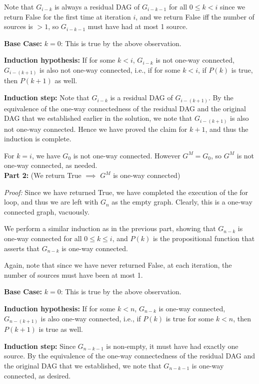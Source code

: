 \documentclass[answers]{exam}
\begin{document}
\begin{questions}
\begin{solution}
Note that $G_{i - k}$ is always a residual DAG of $G_{i - k - 1}$ for all $0 \le k < i$ since we return False for the first time at iteration $i$, and we return False iff the number of sources is $> 1$, so $G_{i - k - 1}$ must have had at most 1 source.

\textbf{Base Case:} $k = 0$: This is true by the above observation.

\textbf{Induction hypothesis:} If for some $k < i$, $G_{i - k}$ is not one-way connected, $G_{i - (k + 1)}$ is also not one-way connected, i.e., if for some $k < i$, if $P(k)$ is true, then $P(k + 1)$ as well.

\textbf{Induction step:} Note that $G_{i - k}$ is a residual DAG of $G_{i - (k + 1)}$. By the equivalence of the one-way connectedness of the residual DAG and the original DAG that we established earlier in the solution, we note that $G_{i - (k + 1)}$ is also not one-way connected. Hence we have proved the claim for $k + 1$, and thus the induction is complete.

For $k = i$, we have $G_0$ is not one-way connected. However $G^M = G_0$, so $G^M$ is not one-way connected, as needed.\\

\textbf{Part 2:} (We return True $\implies$ $G^M$ is one-way connected)

\textit{Proof:} Since we have returned True, we have completed the execution of the for loop, and thus we are left with $G_n$ as the empty graph. Clearly, this is a one-way connected graph, vacuously.

We perform a similar induction as in the previous part, showing that $G_{n - k}$ is one-way connected for all $0 \le k \le i$, and $P(k)$ is the propositional function that asserts that $G_{n - k}$ is one-way connected.

Again, note that since we have never returned False, at each iteration, the number of sources must have been at most 1.

\textbf{Base Case:} $k = 0$: This is true by the above observation. 

\textbf{Induction hypothesis:} If for some $k < n$, $G_{n - k}$ is one-way connected, $G_{n - (k + 1)}$ is also one-way connected, i.e., if $P(k)$ is true for some $k < n$, then $P(k + 1)$ is true as well.

\textbf{Induction step:} Since $G_{n - k - 1}$ is non-empty, it must have had exactly one source. By the equivalence of the one-way connectedness of the residual DAG and the original DAG that we established, we note that $G_{n - k - 1}$ is one-way connected, as desired.


\end{solution}
\end{questions}
\end{document}
